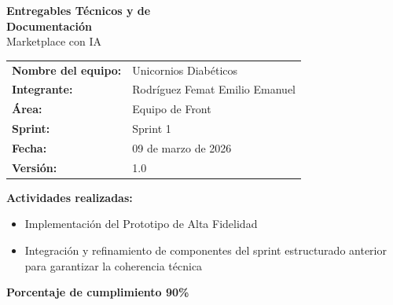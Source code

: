 \documentclass[12pt,a4paper]{article}
\begin{document}
\begin{titlepage}
\centering
\vspace*{2cm}

{\Huge\bfseries\color{darkbg} Entregables Técnicos y de\\[6pt] Documentación}\\[1.5cm]
{\LARGE\color{darkprimary} Marketplace con IA}\\[2cm]

\begin{tabular}{ll}
\textbf{Nombre del equipo:} & Unicornios Diabéticos \\[8pt]
\textbf{Integrante:} & Rodríguez Femat Emilio Emanuel \\[8pt]
\textbf{Área:} & Equipo de Front \\[8pt]
\textbf{Sprint:} & Sprint 1 \\[8pt]
\textbf{Fecha:} & 09 de marzo de 2026 \\[8pt]
\textbf{Versión:} & 1.0 \\
\end{tabular}

\vspace{2cm}

{\large\bfseries Actividades realizadas:}\\[0.7cm]
\begin{minipage}{0.8\textwidth}
\begin{itemize}[leftmargin=*]
    \item Implementación del Prototipo de Alta Fidelidad
    \item Integración y refinamiento de componentes del sprint estructurado anterior para garantizar la coherencia técnica
\end{itemize}
\end{minipage}

{\large\bfseries Porcentaje de cumplimiento 90\%}\\[0.7cm]

\vfill
\end{titlepage}

\tableofcontents
\newpage

\end{document}
